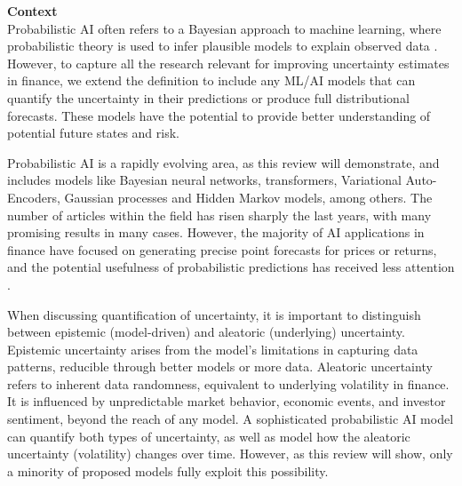 \textbf{Context}\\
Probabilistic AI often refers to a Bayesian approach to machine learning, where probabilistic theory is used to infer plausible models to explain observed data \parencite{Ghahramani2015}. However, to capture all the research relevant for improving uncertainty estimates in finance, we extend the definition to include any ML/AI models that can quantify the uncertainty in their predictions or produce full distributional forecasts. These models have the potential to provide better understanding of potential future states and risk.

Probabilistic AI is a rapidly evolving area, as this review will demonstrate, and includes models like Bayesian neural networks, transformers, Variational Auto-Encoders, Gaussian processes and Hidden Markov models, among others. The number of articles within the field has risen sharply the last years, with many promising results in many cases. However, the majority of AI applications in finance have focused on generating precise point forecasts for prices or returns, and the potential usefulness of probabilistic predictions has received less attention \parencite{sezer2020financial}.

When discussing quantification of uncertainty, it is important to distinguish between epistemic (model-driven) and aleatoric (underlying) uncertainty. Epistemic uncertainty arises from the model's limitations in capturing data patterns, reducible through better models or more data. Aleatoric uncertainty refers to inherent data randomness, equivalent to underlying volatility in finance. It is influenced by unpredictable market behavior, economic events, and investor sentiment, beyond the reach of any model. \parencite[7,34]{pml1Book, KIUREGHIAN2009105, hullermeier2021aleatoric} A sophisticated probabilistic AI model can quantify both types of uncertainty, as well as model how the aleatoric uncertainty (volatility) changes over time. However, as this review will show, only a minority of proposed models fully exploit this possibility.



